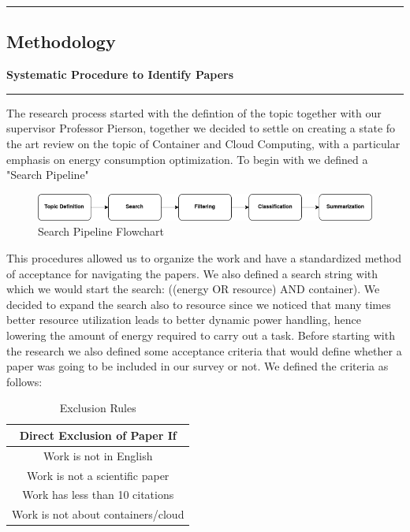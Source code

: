 {\color{gray}\hrule}
\begin{center}
\section{Methodology}
\textbf{Systematic Procedure to Identify Papers}
\bigskip
\end{center}
{\color{gray}\hrule}
\begin{multicols}{2}
The research process started with the defintion of the topic together with our supervisor Professor Pierson, together we decided to settle on creating a state fo the art review on the topic of Container and Cloud Computing, with a particular emphasis on energy consumption optimization. 
To begin with we defined a "Search Pipeline"


\begin{figure}[H]
    \centering
    \includegraphics[width=\columnwidth]{flowchartTIR.png}
    \caption{Search Pipeline Flowchart}
    \label{fig:search_pipeline}
\end{figure}

This procedures allowed us to organize the work and have a standardized method of acceptance for navigating the papers. 
We also defined a search string with which we would start the search: ((energy OR resource) AND container).
We decided to expand the search also to resource since we noticed that many times better resource utilization leads to better dynamic power handling, hence lowering the amount of energy required to carry out a task.
Before starting with the research we also defined some acceptance criteria that would define whether a paper was going to be included in our survey or not. We defined the criteria as follows:



\begin{table}[H]
\centering
\begin{tabular}{c}
\hline
Direct Exclusion of Paper If \\ \hline
Work is not in English \\ 
Work is not a scientific paper \\ 
Work has less than 10 citations \\ 
Work is not about containers/cloud \\ \hline
\end{tabular}
    \caption{Exclusion Rules}
    \label{tab:Exclusion Rules}
\end{table}


\end{multicols}
